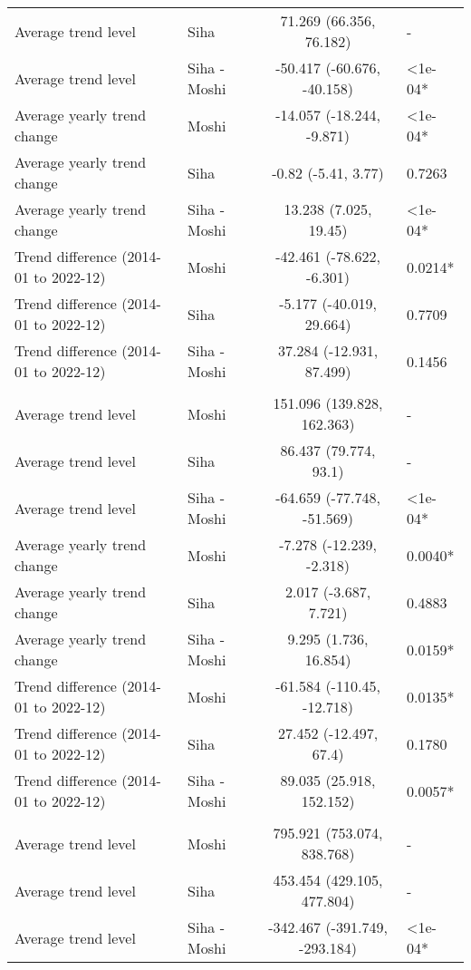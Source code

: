 \begin{longtable}{l|lcl}
Average trend level & Siha & 71.269 (66.356, 76.182) & - \\ 
Average trend level & Siha - Moshi & -50.417 (-60.676, -40.158) & <1e-04* \\ 
Average yearly trend change & Moshi & -14.057 (-18.244, -9.871) & <1e-04* \\ 
Average yearly trend change & Siha & -0.82 (-5.41, 3.77) & 0.7263 \\ 
Average yearly trend change & Siha - Moshi & 13.238 (7.025, 19.45) & <1e-04* \\ 
Trend difference (2014-01 to 2022-12) & Moshi & -42.461 (-78.622, -6.301) & 0.0214* \\ 
Trend difference (2014-01 to 2022-12) & Siha & -5.177 (-40.019, 29.664) & 0.7709 \\ 
Trend difference (2014-01 to 2022-12) & Siha - Moshi & 37.284 (-12.931, 87.499) & 0.1456 \\ 
\midrule\addlinespace[2.5pt]
\multicolumn{4}{l}{Fractures} \\[2.5pt] 
\midrule\addlinespace[2.5pt]
Average trend level & Moshi & 151.096 (139.828, 162.363) & - \\ 
Average trend level & Siha & 86.437 (79.774, 93.1) & - \\ 
Average trend level & Siha - Moshi & -64.659 (-77.748, -51.569) & <1e-04* \\ 
Average yearly trend change & Moshi & -7.278 (-12.239, -2.318) & 0.0040* \\ 
Average yearly trend change & Siha & 2.017 (-3.687, 7.721) & 0.4883 \\ 
Average yearly trend change & Siha - Moshi & 9.295 (1.736, 16.854) & 0.0159* \\ 
Trend difference (2014-01 to 2022-12) & Moshi & -61.584 (-110.45, -12.718) & 0.0135* \\ 
Trend difference (2014-01 to 2022-12) & Siha & 27.452 (-12.497, 67.4) & 0.1780 \\ 
Trend difference (2014-01 to 2022-12) & Siha - Moshi & 89.035 (25.918, 152.152) & 0.0057* \\ 
\midrule\addlinespace[2.5pt]
\multicolumn{4}{l}{Hypertension} \\[2.5pt] 
\midrule\addlinespace[2.5pt]
Average trend level & Moshi & 795.921 (753.074, 838.768) & - \\ 
Average trend level & Siha & 453.454 (429.105, 477.804) & - \\ 
Average trend level & Siha - Moshi & -342.467 (-391.749, -293.184) & <1e-04* \\ 

\end{longtable}

